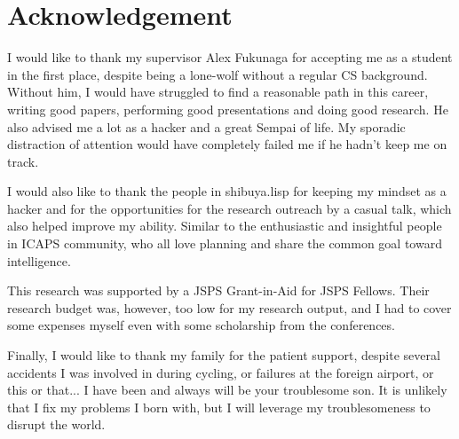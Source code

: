 
\chapter{Acknowledgement}

I would like to thank my supervisor Alex Fukunaga for accepting me as a
student in the first place, despite being a lone-wolf without a regular CS
background. Without him, I would have struggled to find a reasonable
path in this career, writing good papers, performing good presentations and doing good research.
He also advised me a lot as a hacker and a great Sempai of life.
My sporadic distraction of attention would have completely failed me
if he hadn't keep me on track.

I would also like to thank the people in shibuya.lisp for keeping my
mindset as a hacker and for the opportunities for the research outreach by
a casual talk, which also helped improve my ability. Similar to the enthusiastic and insightful people in ICAPS community,
who all love planning and share the common goal toward intelligence.

This research was supported by a JSPS Grant-in-Aid for JSPS
Fellows. Their research budget was, however, too low for my research
output, and I had to cover some expenses myself even with some
scholarship from the conferences.

Finally, I would like to thank my family for the patient support,
despite several accidents I was involved in during cycling, or failures
at the foreign airport, or this or that...  I have been and always will
be your troublesome son.  It is unlikely that I fix my problems I born
with, but I will leverage my troublesomeness to disrupt the world.

